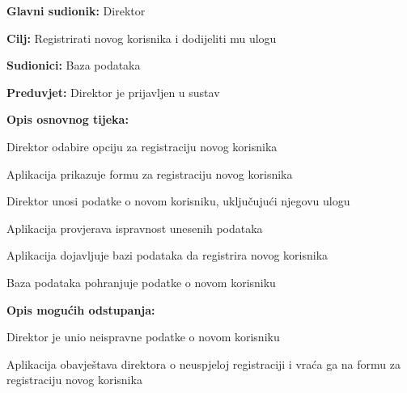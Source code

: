 					\noindent {}
					\begin{packed_item}
	
						\item \textbf{Glavni sudionik:} Direktor
						\item  \textbf{Cilj:} Registrirati novog korisnika i dodijeliti mu ulogu
						\item  \textbf{Sudionici:} Baza podataka
						\item  \textbf{Preduvjet:} Direktor je prijavljen u sustav
						\item  \textbf{Opis osnovnog tijeka:}
						
						\item[] \begin{packed_enum}
	
							\item Direktor odabire opciju za registraciju novog korisnika
							\item Aplikacija prikazuje formu za registraciju novog korisnika
							\item Direktor unosi podatke o novom korisniku, uključujući njegovu ulogu
							\item Aplikacija provjerava ispravnost unesenih podataka
							\item Aplikacija dojavljuje bazi podataka da registrira novog korisnika
							\item Baza podataka pohranjuje podatke o novom korisniku

						\end{packed_enum}

						\item  \textbf{Opis mogućih odstupanja:}
						
						\item[] \begin{packed_item}
	
							\item[4.a] Direktor je unio neispravne podatke o novom korisniku
							\item[] \begin{packed_enum}
								
								\item Aplikacija obavještava direktora o neuspjeloj registraciji i vraća ga na formu za registraciju novog korisnika

							\end{packed_enum}
							
						\end{packed_item}

					\end{packed_item}


